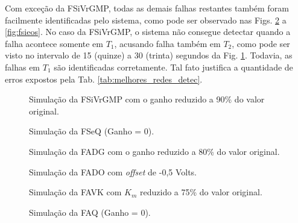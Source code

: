 Com exceção da FSiVrGMP, todas as demais falhas restantes também foram
facilmente identificadas pelo sistema, como pode ser observado nas Figs.
\ref{fig:fseq} a \ref{fig:fsieos}. No caso da FSiVrGMP, o sistema não consegue
detectar quando a falha acontece somente em $T_1$, acusando falha também em
$T_2$, como pode ser visto no intervalo de 15 (quinze) a 30 (trinta) segundos da
Fig. \ref{fig:fsivrgmp}. Todavia, as falhas em $T_1$ são identificadas
corretamente. Tal fato justifica a quantidade de erros expostos pela Tab.
\ref{tab:melhores_redes_detec}.

\begin{figure}[htb]
\footnotesize
\centering

\vspace{1cm}
\caption{Simulação da FSiVrGMP com o ganho reduzido a 90\% do valor original.}
\label{fig:fsivrgmp}
\end{figure}

\begin{figure}[htb]
\footnotesize
\centering

\vspace{1cm}
\caption{Simulação da FSeQ (Ganho = 0).}
\label{fig:fseq}
\end{figure}

\begin{figure}[htb]
\footnotesize
\centering

\vspace{1cm}
\caption{Simulação da FADG com o ganho reduzido a 80\% do valor original.}
\label{fig:fadg}
\end{figure}

\begin{figure}[htb]
\footnotesize
\centering

\vspace{1cm}
\caption{Simulação da FADO com {\it offset} de -0,5 Volts.}
\label{fig:fado}
\end{figure}

\begin{figure}[htb]
\footnotesize
\centering

\vspace{1cm}
\caption{Simulação da FAVK com $K_m$ reduzido a 75\% do valor original.}
\label{fig:favk}
\end{figure}

\begin{figure}[htb]
\footnotesize
\centering

\vspace{1cm}
\caption{Simulação da FAQ (Ganho = 0).}
\label{fig:faq}
\end{figure}

